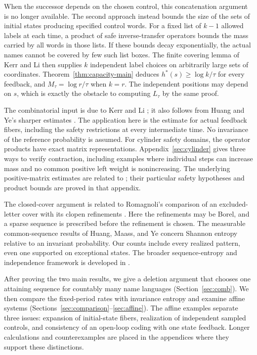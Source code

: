 \documentclass[11pt,reqno]{amsart}
\numberwithin{equation}{section}
\theoremstyle{definition}
\theoremstyle{definition}
\begin{document}
When the successor depends on the chosen control, this concatenation
argument is no longer available. The second approach instead bounds
the size of the sets of initial states producing specified control
words. For a fixed list of $k-1$ allowed labels at each time, a product
of safe inverse-transfer operators bounds the mass carried by all words
in those lists. If these bounds decay exponentially, the actual names
cannot be covered by few such list boxes. The finite covering lemma
of Kerr and Li then supplies $k$ independent label choices on
arbitrarily large sets of coordinates. Theorem~\ref{thm:capacity-main}
deduces $h^*(s)\ge\log k/\tau$ for every feedback, and
$M_\tau=\log r/\tau$ when $k=r$. The independent positions may
depend on $s$, which is exactly the obstacle to computing $L_\tau$
by the same proof.

The combinatorial input is due to Kerr and Li
\cite[Lemma~3.3]{KL2007}; it also follows from Huang and Ye's
sharper estimates \cite[Lemma~4.1 and Remark~4.2]{HuangYe2009}.
The application here is the estimate for actual feedback fibers,
including the safety restrictions at every intermediate time. No
invariance of the reference probability is assumed. For cylinder
safety domains, the operator products have exact matrix
representations. Appendix~\ref{sec:cylinder} gives three ways to
verify contraction, including examples where individual steps can
increase mass and no common positive left weight is nonincreasing.
The underlying positive-matrix estimates are related to
\cite{Shi2021,Debauche2022}; their particular safety hypotheses and
product bounds are proved in that appendix.

The closed-cover argument is related to Romagnoli's comparison of
an excluded-letter cover with its clopen refinements
\cite{Romagnoli2007}. Here the refinements may be Borel, and a
sparse sequence is prescribed before the refinement is chosen.
The measurable common-sequence results of Huang, Maass, and Ye
\cite[Lemma~3.3 and Theorem~3.5]{HuangMaassYe2004} concern
Shannon entropy relative to an invariant probability. Our counts
include every realized pattern, even one supported on exceptional
states. The broader sequence-entropy and independence framework is
developed in \cite{Goodman1974,Hulse1982,KamaeZamboniSystems2002,
KL2007,KL2009}.

After proving the two main results, we give a deletion argument that
chooses one attaining sequence for countably many name languages
(Section~\ref{sec:comb}). We then compare the fixed-period rates
with invariance entropy and examine affine systems
(Sections~\ref{sec:comparison}--\ref{sec:affine}). The affine
examples separate three issues: expansion of initial-state fibers,
realization of independent sampled controls, and consistency of an
open-loop coding with one state feedback. Longer calculations and
counterexamples are placed in the appendices where they support
these distinctions.
\end{document}

